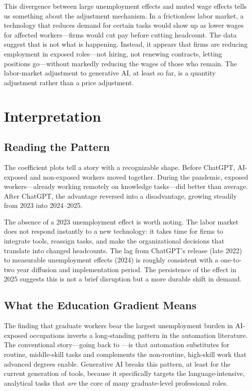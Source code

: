 \documentclass[11pt]{article}
\begin{document}
This divergence between large unemployment effects and muted wage effects tells us something about the adjustment mechanism. In a frictionless labor market, a technology that reduces demand for certain tasks would show up as lower wages for affected workers---firms would cut pay before cutting headcount. The data suggest that is not what is happening. Instead, it appears that firms are reducing employment in exposed roles---not hiring, not renewing contracts, letting positions go---without markedly reducing the wages of those who remain. The labor-market adjustment to generative AI, at least so far, is a quantity adjustment rather than a price adjustment.

\section{Interpretation}
\label{sec:interpretation}

\subsection{Reading the Pattern}

The coefficient plots tell a story with a recognizable shape. Before ChatGPT, AI-exposed and non-exposed workers moved together. During the pandemic, exposed workers---already working remotely on knowledge tasks---did better than average. After ChatGPT, the advantage reversed into a disadvantage, growing steadily from 2023 into 2024--2025.

The absence of a 2023 unemployment effect is worth noting. The labor market does not respond instantly to a new technology: it takes time for firms to integrate tools, reassign tasks, and make the organizational decisions that translate into changed headcounts. The lag from ChatGPT's release (late 2022) to measurable unemployment effects (2024) is roughly consistent with a one-to-two year diffusion and implementation period. The persistence of the effect in 2025 suggests this is not a brief disruption but a more durable shift in demand.

\subsection{What the Education Gradient Means}

The finding that graduate workers bear the largest unemployment burden in AI-exposed occupations inverts a long-standing pattern in the automation literature. The conventional story---going back to \textcite{autor2003skill}---is that automation substitutes for routine, middle-skill tasks and complements the non-routine, high-skill work that advanced degrees enable. Generative AI breaks this pattern, at least for the current generation of tools, because it specifically targets the language-intensive, analytical tasks that \emph{are} the core of many graduate-level professional roles.
\end{document}
